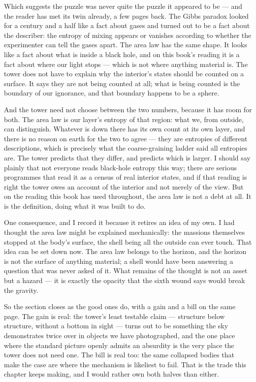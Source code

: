 \documentclass[fontsize=11pt,paper=a4,pagesize=auto,parskip=half-]{scrbook}
\begin{document}
Which suggests the puzzle was never quite the puzzle it appeared to be --- and the reader has met its twin already, a few pages back. The Gibbs paradox looked for a century and a half like a fact about gases and turned out to be a fact about the describer: the entropy of mixing appears or vanishes according to whether the experimenter can tell the gases apart. The area law has the same shape. It looks like a fact about what is inside a black hole, and on this book's reading it is a fact about where our light stops --- which is not where anything material is. The tower does not have to explain why the interior's states should be counted on a surface. It says they are not being counted at all; what is being counted is the boundary of our ignorance, and that boundary happens to be a sphere.

And the tower need not choose between the two numbers, because it has room for both. The area law is our layer's entropy of that region: what we, from outside, can distinguish. Whatever is down there has its own count at its own layer, and there is no reason on earth for the two to agree --- they are entropies of different descriptions, which is precisely what the coarse-graining ladder said all entropies are. The tower predicts that they differ, and predicts which is larger. I should say plainly that not everyone reads black-hole entropy this way; there are serious programmes that read it as a census of real interior states, and if that reading is right the tower owes an account of the interior and not merely of the view. But on the reading this book has used throughout, the area law is not a debt at all. It is the definition, doing what it was built to do.

One consequence, and I record it because it retires an idea of my own. I had thought the area law might be explained mechanically: the massions themselves stopped at the body's surface, the shell being all the outside can ever touch. That idea can be set down now. The area law belongs to the horizon, and the horizon is not the surface of anything material; a shell would have been answering a question that was never asked of it. What remains of the thought is not an asset but a hazard --- it is exactly the opacity that the sixth wound says would break the gravity.

So the section closes as the good ones do, with a gain and a bill on the same page. The gain is real: the tower's least testable claim --- structure below structure, without a bottom in sight --- turns out to be something the sky demonstrates twice over in objects we have photographed, and the one place where the standard picture openly admits an absurdity is the very place the tower does not need one. The bill is real too: the same collapsed bodies that make the case are where the mechanism is likeliest to fail. That is the trade this chapter keeps making, and I would rather own both halves than either.
\end{document}
